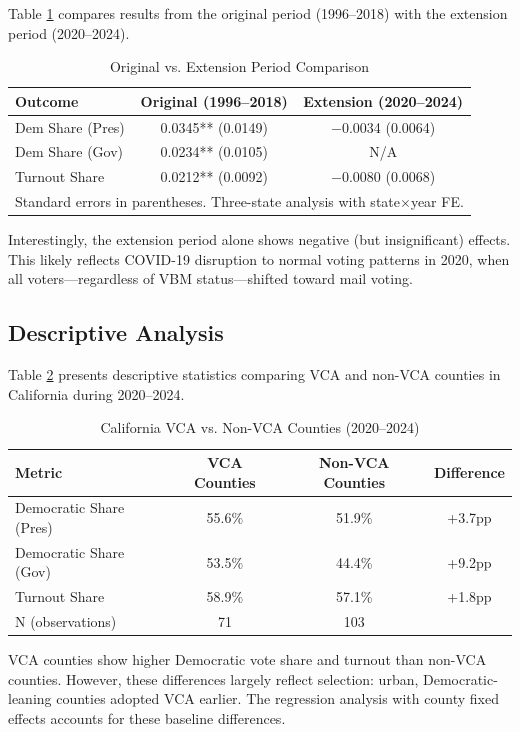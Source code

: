 \documentclass[12pt]{article}
\begin{document}
Table \ref{tab:comparison} compares results from the original period (1996--2018) with the extension period (2020--2024).

\begin{table}[H]
\centering
\caption{Original vs. Extension Period Comparison}
\label{tab:comparison}
\begin{tabular}{lcc}
\toprule
Outcome & Original (1996--2018) & Extension (2020--2024) \\
\midrule
Dem Share (Pres) & 0.0345** (0.0149) & $-$0.0034 (0.0064) \\
Dem Share (Gov) & 0.0234** (0.0105) & N/A \\
Turnout Share & 0.0212** (0.0092) & $-$0.0080 (0.0068) \\
\bottomrule
\multicolumn{3}{l}{\footnotesize Standard errors in parentheses. Three-state analysis with state$\times$year FE.} \\
\end{tabular}
\end{table}

Interestingly, the extension period alone shows negative (but insignificant) effects. This likely reflects COVID-19 disruption to normal voting patterns in 2020, when all voters---regardless of VBM status---shifted toward mail voting.

\subsection{Descriptive Analysis}

Table \ref{tab:descriptive} presents descriptive statistics comparing VCA and non-VCA counties in California during 2020--2024.

\begin{table}[H]
\centering
\caption{California VCA vs. Non-VCA Counties (2020--2024)}
\label{tab:descriptive}
\begin{tabular}{lccc}
\toprule
Metric & VCA Counties & Non-VCA Counties & Difference \\
\midrule
Democratic Share (Pres) & 55.6\% & 51.9\% & +3.7pp \\
Democratic Share (Gov) & 53.5\% & 44.4\% & +9.2pp \\
Turnout Share & 58.9\% & 57.1\% & +1.8pp \\
N (observations) & 71 & 103 & \\
\bottomrule
\end{tabular}
\end{table}

VCA counties show higher Democratic vote share and turnout than non-VCA counties. However, these differences largely reflect selection: urban, Democratic-leaning counties adopted VCA earlier. The regression analysis with county fixed effects accounts for these baseline differences.
\end{document}
